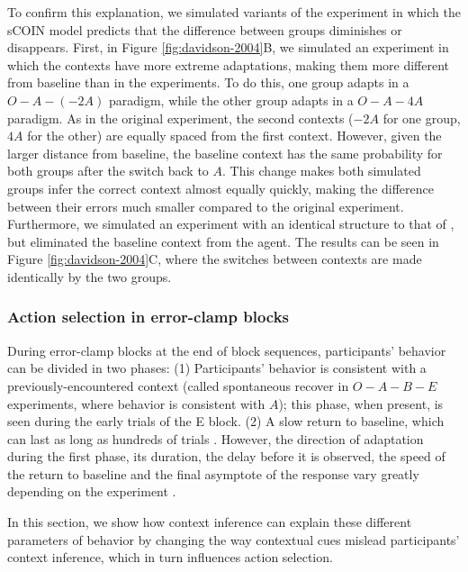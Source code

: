 \documentclass[a4paper,doc,floatsintext,natbib]{apa6}
\def \fref #1{Figure \ref{#1}}     %
\begin{document}
To confirm this explanation, we simulated variants of the experiment in which the sCOIN model predicts that the difference between groups diminishes or disappears. First, in \fref{fig:davidson-2004}B, we simulated an experiment in which the contexts have more extreme adaptations, making them more different from baseline than in the \cite{Davidson_Scaling_2004} experiments. To do this, one group adapts in a $O-A-(-2A)$ paradigm, while the other group adapts in a $O-A-4A$ paradigm. As in the original experiment, the second contexts ($-2A$ for one group, $4A$ for the other) are equally spaced from the first context. However, given the larger distance from baseline, the baseline context has the same probability for both groups after the switch back to $A$. This change makes both simulated groups infer the correct context almost equally quickly, making the difference between their errors much smaller compared to the original experiment. Furthermore, we simulated an experiment with an identical structure to that of \cite{Davidson_Scaling_2004}, but eliminated the baseline context from the agent. The results can be seen in \fref{fig:davidson-2004}C, where the switches between contexts are made identically by the two groups.

\subsubsection{Action selection in error-clamp blocks}
During error-clamp blocks at the end of block sequences, participants' behavior can be divided in two phases: (1) Participants' behavior is consistent with a previously-encountered context (called spontaneous recover in $O-A-B-E$ experiments, where behavior is consistent with $A$); this phase, when present, is seen during the early trials of the E block. (2) A slow return to baseline, which can last as long as hundreds of trials \citep{Brennan_Decay_2015}. However, the direction of adaptation during the first phase, its duration, the delay before it is observed, the speed of the return to baseline and the final asymptote of the response vary greatly depending on the experiment \citep{Brennan_Decay_2015,Vaswani_Decay_2013,Smith_Interacting_2006,Shmuelof_Overcoming_2012}.

In this section, we show how context inference can explain these different parameters of behavior by changing the way contextual cues mislead participants' context inference, which in turn influences action selection.
\end{document}
